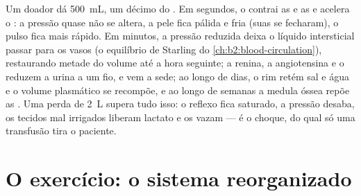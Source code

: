 \begin{example}\label{ex:b2:blood-pressure:haemorrhage}
Um doador dá \qty{500}{mL}, um décimo do . Em segundos, o
 contrai as  e as  e acelera o : a
pressão quase não se altera, a pele fica pálida e fria (suas 
se fecharam), o pulso fica mais rápido. Em minutos, a pressão 
reduzida deixa o líquido intersticial passar para os vasos (o
equilíbrio de Starling do \cref{ch:b2:blood-circulation}), restaurando metade do volume até a
hora seguinte; a renina, a angiotensina e o 
reduzem a urina a um fio, e vem a sede; ao longo de dias, o rim retém
sal e água e o volume plasmático se recompõe, e ao longo de semanas a
medula óssea repõe as . Uma perda de \qty{2}{L} supera tudo
isso: o reflexo fica saturado, a pressão desaba, os tecidos mal
irrigados liberam lactato e os  vazam --- é o choque, do qual
só uma transfusão tira o paciente.
\end{example}

\section{O exercício: o sistema reorganizado}

